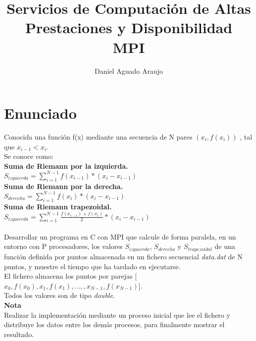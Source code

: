 \newpage \documentclass[a4paper,10pt]{article}
\title{Servicios de Computación de Altas Prestaciones y Disponibilidad \\
MPI}
\author{Daniel Aguado Araujo}
\begin{document}
\maketitle

\newpage

\tableofcontents

\newpage

\section{Enunciado}


Conocida una función f(x) mediante una secuencia de N pares $(x_{i},f(x_{i}))$ , tal que $x_{i - 1} < x_{i}$.\\

Se conoce como:\\

\textbf{Suma de Riemann por la izquierda.}\\

$S_{izquierda} = \sum_{i=1}^{N -1} f(x_{i - 1}) * (x_{i} - x_{i - 1})$\\

\textbf{Suma de Riemann por la derecha.}\\

$S_{derecha} = \sum_{i=1}^{N -1} f(x_{i}) * (x_{i} - x_{i - 1})$\\

\textbf{Suma de Riemann trapezoidal.}\\

$S_{izquierda} = \sum_{i=1}^{N -1} \frac{f(x_{i - 1}) + f(x_{i})}{2} * (x_{i} - x_{i - 1})$\\
\\


Desarrollar un programa en C con MPI que calcule de forma paralela, en un entorno con P procesadores, los valores $S_{izquierda}$, $S_{derecha}$ y $S_{trapezoidal}$ de una función definida por puntos almacenada en un fichero secuencial \textit{data.dat} de N puntos, y muestre el tiempo que ha tardado en ejecutarse. \\

El fichero almacena los puntos por parejas [$x_{0},f(x_{0}),x_{1},f(x_{1}), ..., ,x_{N - 1},f(x_{N - 1})$]. \\

Todos los valores son de tipo \textit{double}.\\

\textbf{Nota}\\

Realizar la implementación mediante un proceso inicial que lee el fichero y distribuye los datos entre los demás procesos, para finalmente mostrar el resultado.\\
\end{document}
